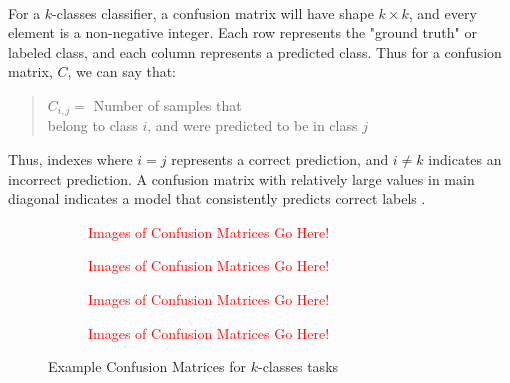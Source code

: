 \documentclass[12pt,letterpaper]{article}
\begin{document}
\paragraph*{}For a $k$-classes classifier, a confusion matrix will have shape $k \times k$, and every element is a non-negative integer. Each row represents the "ground truth" or  labeled class, and each column represents a predicted class. Thus for a confusion matrix, $C$, we can say that:
\begin{quote}
\label{eqn-ConfMat}
\begin{center}
$C_{i,j} =$ Number of samples that \\ 
belong to class $i$, and were predicted to be in class $j$
\end{center}

\end{quote}
Thus, indexes where $i = j$ represents a correct prediction, and $i \neq k$ indicates an incorrect prediction. A confusion matrix with relatively large values in main diagonal indicates a model that consistently predicts correct labels \cite{Geron}. 

\begin{figure}[H]
\label{fig-ConfMat}
	\begin{subfigure}[h]{0.45\textwidth}
	\begin{center}
	\textcolor{red}{Images of Confusion Matrices Go Here!} 
	\end{center}
	\end{subfigure}
	\begin{subfigure}[h]{0.45\textwidth}
	\begin{center}
	\textcolor{red}{Images of Confusion Matrices Go Here!} 
	\end{center}
	\end{subfigure}
	\begin{subfigure}[h]{0.45\textwidth}
	\begin{center}
	\textcolor{red}{Images of Confusion Matrices Go Here!} 
	\end{center}
	\end{subfigure}
	\begin{subfigure}[h]{0.45\textwidth}
	\begin{center}
	\textcolor{red}{Images of Confusion Matrices Go Here!} 
	\end{center}
	\end{subfigure}
\caption{Example Confusion Matrices for $k$-classes tasks}
\end{figure}
 
\end{document}
